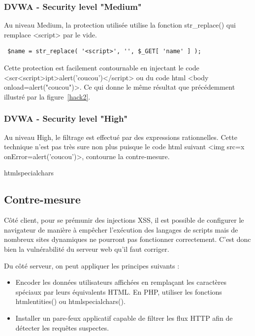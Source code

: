 \subsubsection{DVWA - Security level "Medium"}
Au niveau Medium, la protection utilisée utilise la fonction  str\_replace()
qui remplace <script> par le vide.  
\begin{verbatim}
 $name = str_replace( '<script>', '', $_GET[ 'name' ] ); 
\end{verbatim}
Cette protection est facilement contournable en injectant le code
<scr<script>ipt>alert('coucou')</script> ou du code html <body onload=alert("coucou")>. Ce qui donne le même résultat
que précédemment illustré par la figure~\ref{hack2}. 

\subsubsection{DVWA - Security level "High"}

Au niveau High, le filtrage est effectué par des expressions rationnelles.
Cette technique n'est pas très sure non plus puisque le code html suivant
<img src=x onError=alert('coucou')>, contourne la contre-mesure.

htmlspecialchars

\subsection{Contre-mesure}

Côté client, pour se prémunir des injections XSS, il est possible de configurer le navigateur de manière à empêcher l'exécution des langages de scripts mais de nombreux sites dynamiques ne pourront pas fonctionner correctement. C'est donc bien la vulnérabilité du serveur web qu'il faut corriger.
{
Du côté serveur, on peut appliquer les principes suivants :
\begin{itemize}[font=\color{magenta} \Large, label=]
	\item Encoder les données utilisateurs affichées en remplaçant les caractères spéciaux par leurs équivalents HTML. En PHP, utiliser les fonctions htmlentities() ou htmlspecialchars().​ 
	\item Installer un pare-feux applicatif capable de filtrer les flux HTTP afin de détecter les requêtes suspectes.

\end{itemize}

}

\newpage
